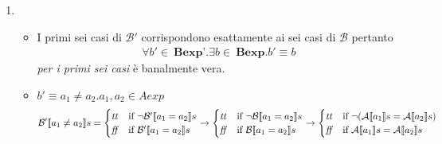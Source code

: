 {\begin{enumerate}[label=(\alph*)]
   =
  \caseFun{\semtrue}
          { < }
          {\semfalse}
          { \not < } \\ \\

   =
  \caseFun{\semtrue}
          { \geq {}}
          {\semfalse}
          { \not \geq {}} \\ \\

   = 
  \caseFun{\semtrue}
          { = \semfalse \ \mbox{ or } \
            ( = \semtrue \ \mbox{and} \  = \semtrue)}
          {\semfalse}
          { = \semtrue \ \mbox{ and } \ 
             = \semfalse} \\ \\

   =
  \caseFun{\semtrue}
          { = \Bext{b_2}}
          {\semfalse}
          {\Bext{b_1} \neq {}} \\ \\

\item
  \begin{itemize}
    \item I primi sei casi di $\mathcal{B'}$ corrispondono esattamente ai sei 
casi di $\mathcal{B}$ pertanto 
      \begin{align*}
        \forall b' \in \ \textbf{Bexp'}.\exists b \in 
        \ \textbf{Bexp}.b' \equiv b
      \end{align*}
      \textit{per i primi sei casi} è banalmente vera.
    \item $b' \equiv a_1 \neq a_2. a_1, a_2 \in Aexp$ \\ 
      \begin{align*}
        \mathcal{B'} \llbracket a_1 \neq a_2 \rrbracket s = 
        \begin{cases} 
          \mbox{\textit{tt}} & 
          \mbox{if} \ \lnot \mathcal{B'} \llbracket a_1 = a_2 \rrbracket s \\ 
          \mbox{\textit{ff}} & 
          \mbox{if}  \ \mathcal{B'} \llbracket a_1 = a_2 \rrbracket s\\
        \end{cases}
        \rightarrow
        \begin{cases} 
          \mbox{\textit{tt}} & 
          \mbox{if} \ \lnot \mathcal{B} \llbracket a_1 = a_2 \rrbracket s \\ 
          \mbox{\textit{ff}} & 
          \mbox{if}  \ \mathcal{B} \llbracket a_1 = a_2 \rrbracket s\\
        \end{cases}
        \rightarrow
        \begin{cases} 
          \mbox{\textit{tt}} & 
          \mbox{if} \ \lnot (\mathcal{A} \llbracket a_1 \rrbracket s = \mathcal{A} \llbracket a_2 \rrbracket s) \\ 
          \mbox{\textit{ff}} & 
          \mbox{if}  \ \mathcal{A} \llbracket a_1 \rrbracket s = \mathcal{A} \llbracket a_2 \rrbracket s\\
        \end{cases} 
      \end{align*}
    

\end{itemize}
\end{enumerate}}
